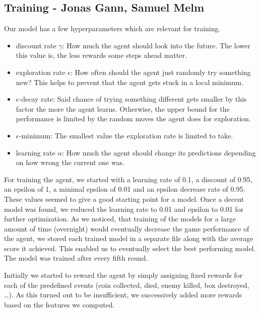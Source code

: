 \documentclass{article}
\begin{document}
\subsection[Training]{Training {\small - Jonas Gann, Samuel Melm}} \label{sec:training}

Our model has a few hyperparameters which are relevant for training.

\begin{itemize}
    \item discount rate $\gamma$: How much the agent should look into the future. The lower this value is, the less rewards some steps ahead matter.
    \item exploration rate $\epsilon$: How often should the agent just randomly try something new? This helps to prevent that the agent gets stuck in a local minimum.
    \item $\epsilon$-decay rate: Said chance of trying something different gets smaller by this factor the more the agent learns. Otherwise, the upper bound for the performance is limited by the random moves the agent does for exploration.
    \item $\epsilon$-minimum: The smallest value the exploration rate is limited to take.
    \item learning rate $\alpha$: How much the agent should change its predictions depending on how wrong the current one was.
\end{itemize}

For training the agent, we started with a learning rate of 0.1, a discount of 0.95, an epsilon of 1, a minimal epsilon of 0.01 and an epsilon decrease rate of 0.95. These values seemed to give a good starting point for a model. Once a decent model was found, we reduced the learning rate to 0.01 and epsilon to 0.01 for further optimization. As we noticed, that training of the models for a large amount of time (overnight) would eventually decrease the game performance of the agent, we stored each trained model in a separate file along with the average score it achieved. This enabled us to eventually select the best performing model. The model was trained after every fifth round.

Initially we started to reward the agent by simply assigning fixed rewards for each of the predefined events (coin collected, died, enemy killed, box destroyed, …). As this turned out to be insufficient, we successively added more rewards based on the features we computed.
\end{document}
